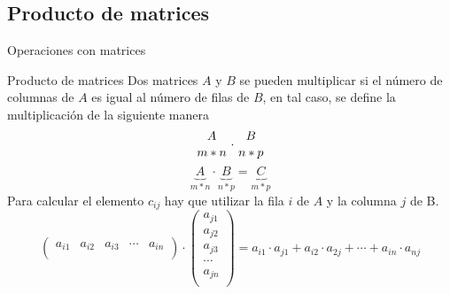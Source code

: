 \documentclass[9pt]{beamer}
\begin{document}
\subsection{Producto de matrices}
\begin{frame}{Operaciones con matrices}
\begin{alertblock}{Producto de matrices}
Dos matrices $A$ y $B$ se pueden multiplicar si el número de columnas de $A$ es igual al número de filas de $B$, en tal caso, se define la multiplicación de la siguiente manera
\[ {A \atop {m\ast n}}\cdot {B \atop {n\ast p}} \]
\[ \underbrace{A}_{m \ast n} \cdot \underbrace{B}_{n\ast p}=\underbrace{C}_{m\ast p} \]
Para calcular el elemento $c_{ij}$ hay que utilizar la fila $i$ de $A$ y la columna $j$ de B.
\[ \begin{pmatrix}
	a_{i1} & a_{i2}&a_{i3}& \cdots &a_{in} \\
\end{pmatrix}\cdot \begin{pmatrix}
	a_{j1} \\ a_{j2}\\a_{j3}\\ \cdots \\a_{jn} \\
\end{pmatrix}=a_{i1}\cdot a_{j1}+ a_{i2} \cdot a_{2j} + \cdots +a_{in}\cdot a_{nj}\]
\end{alertblock}
\end{frame}
\end{document}
